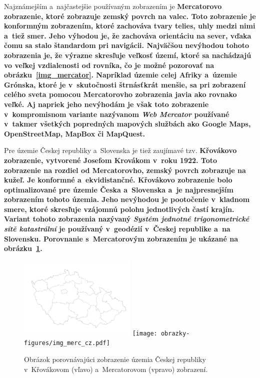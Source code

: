 Najznámejším a~najčastejšie používaným zobrazením je \bf Mercatorovo zobrazenie\rm, ktoré zobrazuje zemský povrch na valec. Toto zobrazenie je konformným zobrazením, ktoré zachováva tvary telies, uhly medzi nimi a~tiež smer. Jeho výhodou je, že zachováva orientáciu na sever, vďaka čomu sa stalo štandardom pri navigácii. Najväčšou nevýhodou tohoto zobrazenia je, že výrazne skresľuje veľkosť území, ktoré sa nachádzajú vo veľkej vzdialenosti od rovníka, čo je možné pozorovať na obrázku~\ref{img_mercator}. Napríklad územie celej Afriky a~územie Grónska, ktoré je v~skutočnosti štrnásťkrát menšie, sa pri zobrazení celého sveta pomocou Mercatorovho zobrazenia javia ako rovnako veľké. Aj napriek jeho nevýhodám je však toto zobrazenie v~kompromisnom variante nazývanom {\it Web Mercator} používané v~takmer všetkých popredných mapových službách ako Google Maps, OpenStreetMap, MapBox či MapQuest.

Pre územie Českej republiky a~Slovenska je tiež zaujímavé tzv. \bf Křovákovo zobrazenie\rm, vytvorené Josefom Krovákom v~roku 1922. Toto zobrazenie na rozdiel od Mercatorovho, zemský povrch zobrazuje na kužeľ. Je konformné a~ekvidistančné. Křovákovo zobrazenie bolo optimalizované pre územie Česka a~Slovenska a~je najpresnejším zobrazením tohoto územia. Jeho nevýhodou je pootočenie v~kladnom smere, ktoré skresľuje vzájomnú polohu jednotlivých častí krajín. Variant tohoto zobrazenia nazývaný {\it Systém jednotné trigonometrické sítě katastrální} je používaný v~geodézií v~Českej republike a~na Slovensku. Porovnanie s~Mercatorovým zobrazením je ukázané na obrázku~\ref{img_krovak}.


\begin{figure}[hbt]
	\centering
	\includegraphics[width=0.5\textwidth]{obrazky-figures/img_krovak_cz.pdf}\hfill
	\texttt{[image: obrazky-figures/img\_merc\_cz.pdf]}\hfill
	\caption{Obrázok porovnávajúci zobrazenie územia Českej republiky v~Křovákovom (vľavo) a~Mercatorovom (vpravo) zobrazení.}
	\label{img_krovak}
\end{figure}


